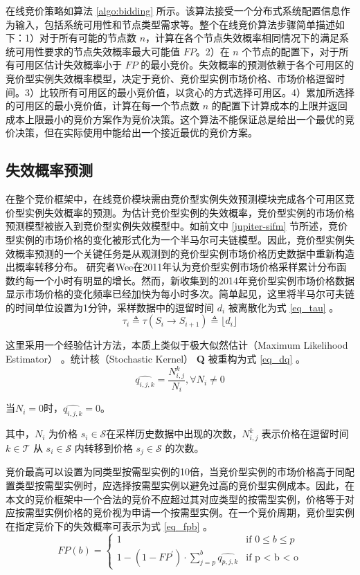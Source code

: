 在线竞价策略如算法 \ref{algo:bidding} 所示。该算法接受一个分布式系统配置信息作为输入，包括系统可用性和节点类型需求等。整个在线竞价算法步骤简单描述如下：1）对于所有可能的节点数 $n$，计算在各个节点失效概率相同情况下的满足系统可用性要求的节点失效概率最大可能值 $FP$。2）在 $n$ 个节点的配置下，对于所有可用区估计失效概率小于 $FP$ 的最小竞价。失效概率的预测依赖于各个可用区的竞价型实例失效概率模型，决定于竞价、竞价型实例市场价格、市场价格逗留时间。3）比较所有可用区的最小竞价值，以贪心的方式选择可用区。4）累加所选择的可用区的最小竞价值，计算在每一个节点数 $n$ 的配置下计算成本的上限并返回成本上限最小的竞价方案作为竞价决策。这个算法不能保证总是给出一个最优的竞价决策，但在实际使用中能给出一个接近最优的竞价方案。

\subsection{失效概率预测}
在整个竞价框架中，在线竞价模块需由竞价型实例失效预测模块完成各个可用区竞价型实例失效概率的预测。为估计竞价型实例的失效概率，竞价型实例的市场价格预测模型被嵌入到竞价型实例失效模型中。如前文中 \ref{jupiter-sifm} 节所述，竞价型实例的市场价格的变化被形式化为一个半马尔可夫链模型。因此，竞价型实例失效概率预测的一个关键任务是从观测到的竞价型实例市场价格历史数据中重新构造出概率转移分布。
研究者Wee\cite{5948651}在2011年认为竞价型实例市场价格采样累计分布函数约每一个小时有明显的增长。然而，新收集到的2014年竞价型实例市场价格数据显示市场价格的变化频率已经加快为每小时多次。简单起见，这里将半马尔可夫链的时间单位设置为1分钟，采样数据中的逗留时间 $d_i$ 被离散化为式 \eqref{eq_tau} 。
\begin{equation}\label{eq_tau}
\tau_i \triangleq \tau(S_i \rightarrow S_{i+1}) \triangleq \lfloor d_i \rfloor
\end{equation}

这里采用一个经验估计方法，本质上类似于极大似然估计（Maximum Likelihood Estimator） \cite{Barbu:2008:SCH:1481376}。统计核（Stochastic Kernel） \textbf{Q} 被重构为式 \eqref{eq_dq} 。
\begin{equation}\label{eq_dq}
\widehat{{q}_{i,j,k}} = \frac{N_{i, j}^{k}}{N_i}, \forall N_i \neq 0
\end{equation}

当$N_i = 0$时，$\widehat{{q}_{i,j,k}} = 0$。

其中，$N_i$ 为价格 $s_i \in \mathcal{S}$在采样历史数据中出现的次数，$N_{i, j}^{k}$ 表示价格在逗留时间 $k \in \mathcal{T}$ 从 $s_i \in \mathcal{S}$ 内转移到价格 $s_j \in \mathcal{S}$ 的次数。

竞价最高可以设置为同类型按需型实例的10倍，当竞价型实例的市场价格高于同配置类型按需型实例时，应选择按需型实例以避免过高的竞价型实例成本。因此，在本文的竞价框架中一个合法的竞价不应超过其对应类型的按需型实例，价格等于对应按需型实例价格的竞价视为申请一个按需型实例。在一个竞价周期，竞价型实例在指定竞价下的失效概率可表示为式 \eqref{eq_fpb} 。
\begin{equation}\label{eq_fpb}
FP(b) = 
\begin{cases}
1 &\mbox{if $0 \leq b \leq p$}\\
1 - (1 - FP^{\prime}) \cdot \sum\limits_{j=p}^b{\widehat{{q}_{p, j, k}}} &\mbox{if p < b < o}
\end{cases}
\end{equation}

